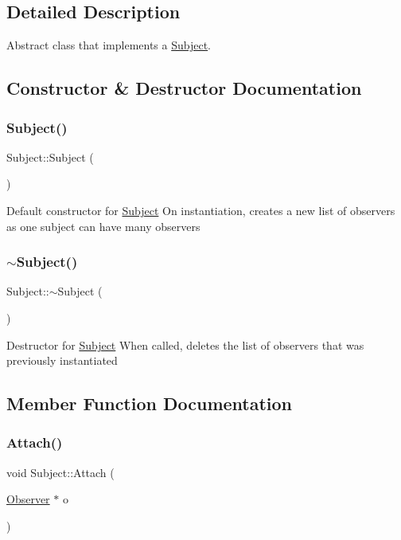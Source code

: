 \subsection{Detailed Description}
Abstract class that implements a \hyperlink{class_subject}{Subject}. 

\subsection{Constructor \& Destructor Documentation}
\hypertarget{class_subject_ab468044832c824c6d6c2f46272655207}{}\label{class_subject_ab468044832c824c6d6c2f46272655207} 
\subsubsection{\texorpdfstring{Subject()}{Subject()}}
{\footnotesize\ttfamily Subject\+::\+Subject (\begin{DoxyParamCaption}{ }\end{DoxyParamCaption})}

Default constructor for \hyperlink{class_subject}{Subject} On instantiation, creates a new list of observers as one subject can have many observers \hypertarget{class_subject_a7c4f522850f718466e5be7eb55ba1969}{}\label{class_subject_a7c4f522850f718466e5be7eb55ba1969} 
\subsubsection{\texorpdfstring{$\sim$\+Subject()}{~Subject()}}
{\footnotesize\ttfamily Subject\+::$\sim$\+Subject (\begin{DoxyParamCaption}{ }\end{DoxyParamCaption})}

Destructor for \hyperlink{class_subject}{Subject} When called, deletes the list of observers that was previously instantiated 

\subsection{Member Function Documentation}
\hypertarget{class_subject_a4178d3cef008c713370791c6578334de}{}\label{class_subject_a4178d3cef008c713370791c6578334de} 
\subsubsection{\texorpdfstring{Attach()}{Attach()}}
{\footnotesize\ttfamily void Subject\+::\+Attach (\begin{DoxyParamCaption}\item[{\hyperlink{class_observer}{Observer} $\ast$}]{o }\end{DoxyParamCaption})\hspace{0.3cm}{\ttfamily [virtual]}}

